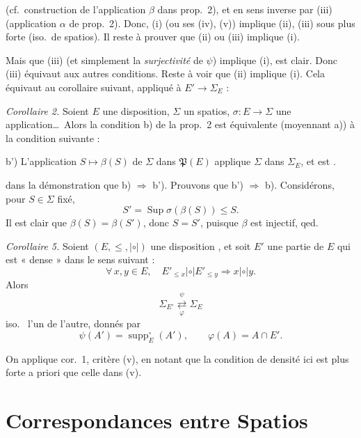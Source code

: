 \documentclass[11pt,a4paper]{article}
\begin{document}

(cf.\ construction de l'application $\beta$ dans prop.~2), et en sens inverse par (iii) (application $\alpha$ de prop.~2). Donc, (i) (ou ses  (iv), (v)) implique (ii), (iii) sous  plus forte (iso.\ de spatios). Il reste à prouver que (ii) ou (iii) implique  (i).

Mais que (iii) (et simplement la \emph{surjectivité} de $\psi$) implique (i), est clair. Donc (iii) équivaut aux autres conditions. Reste à voir que (ii) implique (i). Cela équivaut au corollaire suivant, appliqué à $E' \to \Sigma_E$ :

\emph{Corollaire 2.} Soient $E$ une disposition, $\Sigma$ un spatios, $\sigma : E \to \Sigma$ une application\ldots\ Alors la condition b) de la prop.~2 est équivalente (moyennant a)) à la condition suivante :

b') L'application $S \mapsto \beta(S)$ de $\Sigma$ dans $\mathfrak{P}(E)$ applique $\Sigma$ dans $\Sigma_E$, et est  .

 dans la démonstration que b) $\Rightarrow$ b'). Prouvons que b') $\Rightarrow$ b). Considérons, pour $S \in \Sigma$ fixé,
\[
  S' = \operatorname{Sup} \sigma(\beta(S)) \leq S .
\]
Il est clair que $\beta(S) = \beta(S')$, donc $S = S'$, puisque $\beta$ est injectif, qed.


\emph{Corollaire 5.} Soient $(E, \leq, \mathrel{|\circ|})$ une disposition , et soit $E'$ une partie de $E$ qui est « dense » dans le sens suivant :
\[
  \forall\, x, y \in E, \quad E'_{\leq x} \mathrel{|\circ|} E'_{\leq y} \Longrightarrow x \mathrel{|\circ|} y .
\]
Alors
\[
  \Sigma_{E'} \underset{\varphi}{\overset{\psi}{\rightleftarrows}} \Sigma_E
\]
iso.\  l'un de l'autre, donnés par
\[
  \psi(A') = \operatorname{supp}^{\circ}_E(A') , \qquad \varphi(A) = A \cap E' .
\]

On applique cor.~1, critère (v), en notant que la condition de densité ici est plus forte a priori que celle dans (v).

\section{ Correspondances entre  Spatios}
\end{document}
